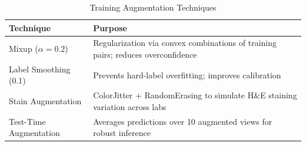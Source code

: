 \begin{table}[h]
\centering
\caption{Training Augmentation Techniques}
\label{tab:augmentation}
\begin{tabular}{lp{7cm}}
\toprule
Technique & Purpose \\
\midrule
Mixup ($\alpha\!=\!0.2$) & Regularization via convex combinations of training pairs; reduces overconfidence \\
Label Smoothing (0.1) & Prevents hard-label overfitting; improves calibration \\
Stain Augmentation & ColorJitter + RandomErasing to simulate H\&E staining variation across labs \\
Test-Time Augmentation & Averages predictions over 10 augmented views for robust inference \\
\bottomrule
\end{tabular}
\end{table}